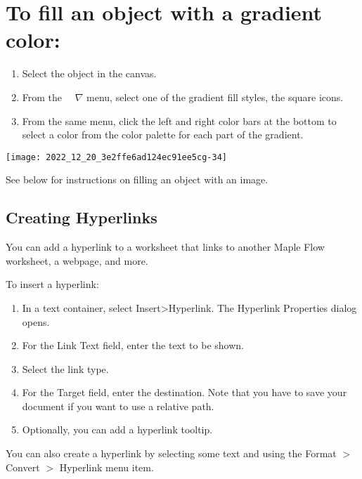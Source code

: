 \section{To fill an object with a gradient color:}
\begin{enumerate}
  \item Select the object in the canvas.

  \item From the $\quad \nabla$ menu, select one of the gradient fill styles, the square icons.

  \item From the same menu, click the left and right color bars at the bottom to select a color from the color palette for each part of the gradient.

\end{enumerate}

\begin{center}
\texttt{[image: 2022\_12\_20\_3e2ffe6ad124ec91ee5cg-34]}
\end{center}

See below for instructions on filling an object with an image.

\subsection{Creating Hyperlinks}
You can add a hyperlink to a worksheet that links to another Maple Flow worksheet, a webpage, and more.

To insert a hyperlink:

\begin{enumerate}
  \item In a text container, select Insert>Hyperlink. The Hyperlink Properties dialog opens.

  \item For the Link Text field, enter the text to be shown.

  \item Select the link type.

  \item For the Target field, enter the destination. Note that you have to save your document if you want to use a relative path.

  \item Optionally, you can add a hyperlink tooltip.

\end{enumerate}

You can also create a hyperlink by selecting some text and using the Format $>$ Convert $>$ Hyperlink menu item.


